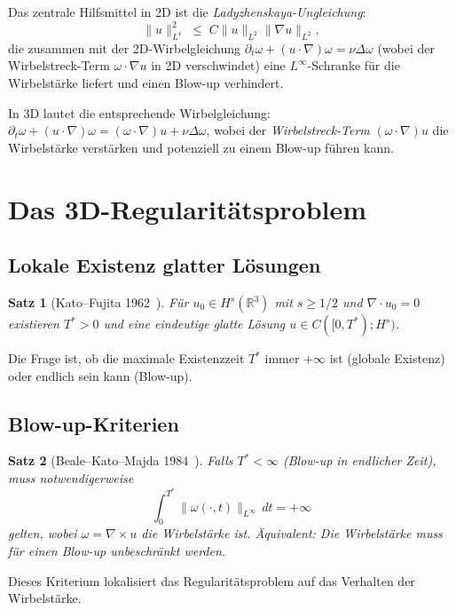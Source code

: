 \documentclass[12pt,a4paper]{article}
\newtheorem{theorem}{Satz}[section]
\theoremstyle{remark}
\begin{document}
Das zentrale Hilfsmittel in 2D ist die \emph{Ladyzhenskaya-Ungleichung}:
\[
  \|u\|_{L^4}^2 \;\leq\; C\|u\|_{L^2}\|\nabla u\|_{L^2},
\]
die zusammen mit der 2D-Wirbelgleichung $\partial_t \omega + (u\cdot\nabla)\omega = \nu\Delta\omega$
(wobei der Wirbelstreck-Term $\omega\cdot\nabla u$ in 2D verschwindet) eine $L^\infty$-Schranke
für die Wirbelstärke liefert und einen Blow-up verhindert.

In 3D lautet die entsprechende Wirbelgleichung:
$\partial_t \omega + (u\cdot\nabla)\omega = (\omega\cdot\nabla)u + \nu\Delta\omega$,
wobei der \emph{Wirbelstreck-Term} $(\omega\cdot\nabla)u$ die Wirbelstärke verstärken und
potenziell zu einem Blow-up führen kann.

\section{Das 3D-Regularitätsproblem}

\subsection{Lokale Existenz glatter Lösungen}

\begin{theorem}[Kato--Fujita 1962~\cite{KatoFujita1962}]
  Für $u_0 \in H^s(\mathbb{R}^3)$ mit $s \geq 1/2$ und $\nabla\cdot u_0=0$ existieren
  $T^* > 0$ und eine eindeutige glatte Lösung $u \in C([0,T^*); H^s)$.
\end{theorem}

Die Frage ist, ob die maximale Existenzzeit $T^*$ immer $+\infty$ ist (globale Existenz)
oder endlich sein kann (Blow-up).

\subsection{Blow-up-Kriterien}

\begin{theorem}[Beale--Kato--Majda 1984~\cite{BKM1984}]
  Falls $T^* < \infty$ (Blow-up in endlicher Zeit), muss notwendigerweise
  \[
    \int_0^{T^*} \|\omega(\cdot,t)\|_{L^\infty}\,dt = +\infty
  \]
  gelten, wobei $\omega = \nabla \times u$ die Wirbelstärke ist. Äquivalent: Die
  Wirbelstärke muss für einen Blow-up unbeschränkt werden.
\end{theorem}

Dieses Kriterium lokalisiert das Regularitätsproblem auf das Verhalten der Wirbelstärke.
\end{document}
